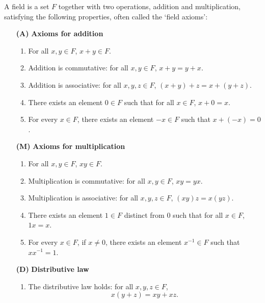 \begin{definition}
    \label{def:field}
    A field is a set \(F\) together with two operations, addition and multiplication, satisfying the following properties, often called the `field axioms':

    \begin{enumerate}
        \item[\textbf{(A)}] \textbf{Axioms for addition}
        \begin{enumerate}[label=(A\arabic*)]
            \item For all \(x, y \in F\), \(x + y \in F\).
            \item Addition is commutative: for all \(x, y \in F\), \(x + y = y + x\).
            \item Addition is associative: for all \(x, y, z \in F\), \((x + y) + z = x + (y + z)\).
            \item There exists an element \(0 \in F\) such that for all \(x \in F\), \(x + 0 = x\).
            \item For every \(x \in F\), there exists an element \(-x \in F\) such that \(x + (-x) = 0\).
        \end{enumerate}

        \medskip

        \item[\textbf{(M)}] \textbf{Axioms for multiplication}
        \begin{enumerate}[label=(M\arabic*)]
            \item For all \(x, y \in F\), \(xy \in F\).
            \item Multiplication is commutative: for all \(x, y \in F\), \(xy = yx\).
            \item Multiplication is associative: for all \(x, y, z \in F\), \((xy)z = x(yz)\).
            \item There exists an element \(1 \in F\) distinct from \(0\) such that for all \(x \in F\), \(1x = x\).
            \item For every \(x \in F\), if \(x \neq 0\), there exists an element \(x^{-1} \in F\) such that \(xx^{-1} = 1\).
        \end{enumerate}
        
        \medskip

        \item[\textbf{(D)}] \textbf{Distributive law}
        \begin{enumerate}[label=(D\arabic*)]
            \item The distributive law holds: for all \(x, y, z \in F\),
            \[
                x(y + z) = xy + xz.
            \]
        \end{enumerate}
    \end{enumerate}
\end{definition}

